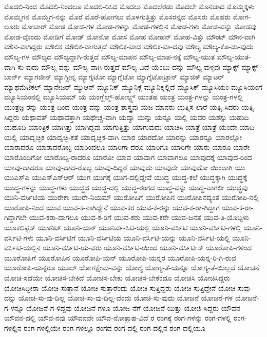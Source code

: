 {ಮೊದಲಿ-ನಿಂದ
ಮೊದಲಿ-ನಿಂದಲೂ
ಮೊದಲಿ-ರಿಸಿದ
ಮೊದಲು
ಮೊದಲೆರಡು
ಮೊದಲೇ
ಮೊನಚಾದ
ಮೊಮ್ಮಕ್ಕಳು
ಮೊಮ್ಮಗನ
ಮೊಮ್ಮಗ-ನನ್ನು
ಮೊರೆ
ಮೊರೆ-ಹೋಗಲು
ಮೊಳಗುತ್ತಿತ್ತು
ಮೊಸರನ್ನದ
ಮೊಸರು
ಮೊಹರು
ಮೋಗ-ಲೂರು
ಮೋಟಾರ್
ಮೋಡ
ಮೋಡ-ಗಳ
ಮೋಡ-ಗಳನ್ನು
ಮೋಡ-ಗಳಲ್ಲಿನ
ಮೋಡ-ಗಳು
ಮೋಡ-ವನ್ನು
ಮೋಡವು
ಮೋಡ-ವೊಂದು
ಮೋಡಿಗೆ
ಮೋಡ್
ಮೋನೋ
ಮೋಸ
ಮೋಹ
ಮೋಹನ್
ಮೋಹ-ವಿತ್ತು
ಮೌಂಟ್
ಮೌನ-ವಾಗಿ
ಮೌನ-ವಾಗಿದ್ದರು
ಮೌಲಿಕ
ಮೌಲಿಕ-ವಾಗುತ್ತದೆ
ಮೌಲಿಕ-ವಾದ
ಮೌಲಿಕ-ವಾ-ದವು
ಮೌಲ್ಯ
ಮೌಲ್ಯ-ಕೊ-ಡು-ವುದು
ಮೌಲ್ಯ-ಗಳ
ಮೌಲ್ಯದ
ಮೌಲ್ಯದ್ದಾಗಿ-ರುತ್ತದೆ
ಮೌಲ್ಯ-ಮಾಪನ
ಮೌಲ್ಯ-ಮಾಪ-ನಕ್ಕೆ
ಮೌಲ್ಯ-ಯುತ
ಮೌಲ್ಯ-ಯುತ-ವಾಗಿ-ಸು-ವುದು
ಮೌಲ್ಯ-ವನ್ನು
ಮೌಲ್ಯ-ವಾಗಿ-ರುತ್ತದೆ
ಮೌಲ್ಯ-ವಿದೆ-ಯೆಂಬು-ದನ್ನು
ಮೌಲ್ಯ-ವುಳ್ಳವು
ಮ್ಯಾಕ್ಸ್
ಮ್ಯಾಕ್ಸ್-ಬಾರ್ನ್
ಮ್ಯಾಗಜೀನ್
ಮ್ಯಾಗ್ಜೀನ್ನ
ಮ್ಯಾಗ್ನಟೋ
ಮ್ಯಾಗ್ನೆಟೋ
ಮ್ಯಾಗ್ನೆಟೋಟ್ರಾನ್
ಮ್ಯಾಜಿಕ್
ಮ್ಯಾಟರ್
ಮ್ಯಾಥಮೆಟಿಕಲ್
ಮ್ಯಾನೇಜರ್
ಮ್ಯುಆನ್
ಮ್ಯೂನಿಕ್
ಮ್ಯೂನಿಕ್ಗೆ
ಮ್ಯೂನಿಕ್ನಲ್ಲಿದೆ
ಮ್ಯೂಸಿಕ್
ಮ್ಯೂಸಿಯಂ
ಮ್ಯೂಸಿಯಂಗೆ
ಮ್ಯೂಸಿಯಂನಲ್ಲಿ
ಮ್ಯೂಸಿಯಮ್
ಯ
ಯಂಗ್ಹೆಲ್ಮ್-ಹೋಲ್ಟ್ಸ್
ಯಂತಹ
ಯಂತ್ರ
ಯಂತ್ರ-ಗಳನ್ನು
ಯಂತ್ರ-ಗಳಲ್ಲಿ
ಯಂತ್ರಜ್ಞ-ರನ್ನು
ಯಂತ್ರ-ದಿಂದ
ಯಂತ್ರ-ವನ್ನು
ಯಂತ್ರ-ಶಾಸ್ತ್ರವು
ಯಜ-ಮಾನರು
ಯತ್ನಿಸ-ಲಾರೆ
ಯತ್ನಿ-ಸಿದರು
ಯತ್ನಿ-ಸಿದ್ದರು
ಯಥಾವತ್
ಯಥಾವತ್ತಾಗಿ
ಯಥೇಚ್ಚ-ವಾಗಿ
ಯದ್ವಾ
ಯನ್ನು
ಯನ್ನೂ
ಯಲ್ಲಿ
ಯವರ
ಯಶಸ್ಸು
ಯಹುದಿ
ಯಹೂದಿ
ಯಾಂತ್ರಿಕ
ಯಾಗಿತ್ತು
ಯಾಗಿದ್ದವು
ಯಾಗುತ್ತಿತ್ತು
ಯಾಗುವುದು
ಯಾಚಿಸಿ
ಯಾತ್ರೆ
ಯಾತ್ರೆ-ಯೆಂದೇ
ಯಾದಿ-ಯಲ್ಲಿ
ಯಾದೃಚ್ಛಿಕ
ಯಾದೃಚ್ಛಿ-ಕತೆ
ಯಾದೃಚ್ಛಿಕ-ವಾಗಿ
ಯಾರ
ಯಾರದೋ
ಯಾರನ್ನು
ಯಾರನ್ನೂ
ಯಾರಲ್ಲೋ
ಯಾರಾದರೂ
ಯಾರಾದರೊಬ್ಬ
ಯಾರಿಂದಲೂ
ಯಾರಿಗಾ-ದರೂ
ಯಾರಿಗೂ
ಯಾರಿಗೇ
ಯಾರು
ಯಾರೂ
ಯಾರೇ
ಯಾರೊಂದಿಗೋ
ಯಾರೊಬ್ಬ-ರಾದರೂ
ಯಾರೋ
ಯಾವ
ಯಾವಾಗ
ಯಾವಾಗಲೂ
ಯಾವುದಕ್ಕೆ
ಯಾವುದ-ರಿಂದ
ಯಾವು-ದಾದರೂ
ಯಾವು-ದಾದ-ರೊಬ್ಬ
ಯಾವು-ದಿದ್ದರೆ
ಯಾವುದು
ಯಾವುದೇ
ಯಾವುದೋ
ಯಿಂದಾಗಿ
ಯು
ಯುಎಸ್ಎ
ಯುಎಸ್ಎಸ್ಆರ್
ಯುಗ
ಯುಗಕ್ಕೆ
ಯುಗ-ದಲ್ಲಿದ್ದೇವೆ
ಯುದ್ಧ
ಯುದ್ಧ-ಕಲೆ
ಯುದ್ಧಕ್ಕಾಗಿ
ಯುದ್ಧಕ್ಕೆ
ಯುದ್ಧ-ಗಳನ್ನು
ಯುದ್ಧ-ಗಳು
ಯುದ್ಧದ
ಯುದ್ಧ-ದಲ್ಲಿ
ಯುದ್ಧ-ರಂಗದ
ಯುದ್ಧ-ವನ್ನು
ಯುದ್ಧ-ವಾಗಲೀ
ಯುದ್ಧವು
ಯುನಿ-ವರ್ಸಿಟಿಯ
ಯುರೇಕಾ
ಯುರೇ-ನಿಯಮ್
ಯುರೋಪಿಗೆ
ಯುರೋಪಿನ
ಯುರೋಪಿನದ್ಯಂತ
ಯುರೋಪಿ-ನಲ್ಲಿ
ಯುರೋಪಿ-ನಿಂದ
ಯುವ
ಯುವ-ಕ-ನಾಗಿದ್ದೇನೆ
ಯುವ-ಕರ
ಯುವ-ಕ-ರನ್ನು
ಯುವ-ಕ-ರಾ-ಗಿದ್ದಾಗ
ಯುವ-ಕ-ರಾ-ಗಿದ್ದಾಗಲೇ
ಯುವ-ಕರಾ-ದಾಗಲೂ
ಯುವ-ಕ-ರಿಗೆ
ಯುವ-ಕರು
ಯುವ-ಕರೇ
ಯುವ-ಜನತೆ
ಯುವ-ತಿ-ಯೊಬ್ಬಳು
ಯೂಕಲಿಪ್ಟಸ್
ಯೂನಿಟ್
ಯೂನಿ-ಯನ್
ಯೂನಿರ್ವ-ಸಿಟಿ-ಯಲ್ಲಿ
ಯೂನಿ-ವರ್ಸಿಟಿ
ಯೂನಿ-ವರ್ಸಿಟಿ-ಗಳಲ್ಲಿ
ಯೂನಿ-ವರ್ಸಿಟಿ-ಗಳು
ಯೂನಿ-ವರ್ಸಿಟಿಗೆ
ಯೂನಿ-ವರ್ಸಿಟಿಯ
ಯೂನಿ-ವರ್ಸಿಟಿ-ಯನ್ನು
ಯೂನಿ-ವರ್ಸಿಟಿ-ಯಲ್ಲಿ
ಯೂನಿ-ವರ್ಸಿಟಿ-ಯಲ್ಲಿನ
ಯೂನಿ-ವರ್ಸಿಟಿ-ಯ-ವರು
ಯೂನಿ-ವರ್ಸಿಟಿ-ಯಿಂದ
ಯೂನಿ-ವರ್ಸಿಟೀಸ್
ಯೂರೋಪಿ-ಗಳಿಂದ
ಯೂರೋಪಿಗೆ
ಯೂರೋಪಿನ
ಯೂರೋಪಿ-ಯನ್
ಯೂರೋಪಿ-ಯನ್ನರ
ಯೂರೋಪಿ-ಯನ್ನ-ರಿ-ಗಿ-ರುವ
ಯೂರೋಪಿ-ಯನ್ನರೂ
ಯೂಲ್
ಯೋಗಕ್ಷೇಮ-ವನ್ನು
ಯೋಗ್ಯ
ಯೋಗ್ಯ-ತೆ-ಯನ್ನೂ
ಯೋಗ್ಯ-ತೆ-ಯಿಲ್ಲದೆ
ಯೋಚನೆ
ಯೋಚಿ-ಸದೆಯೇ
ಯೋಚಿಸ-ಬೇಕಿದೆ
ಯೋಚಿಸ-ಬೇಕು
ಯೋಚಿಸ-ಬೇಕೆಂದೂ
ಯೋಚಿಸಿ
ಯೋಚಿಸಿದ್ದರು
ಯೋಚಿಸಿದ್ದೀರಾ
ಯೋಚಿ-ಸುತ್ತಾನೆ
ಯೋಚಿ-ಸುತ್ತಾರೆಂದು
ಯೋಚಿ-ಸುತ್ತಿದ್ದರು
ಯೋಚಿ-ಸುತ್ತಿದ್ದೇನೆ
ಯೋಚಿ-ಸುವು-ದನ್ನು
ಯೋಚಿ-ಸು-ವು-ದಿಲ್ಲ
ಯೋಚಿ-ಸು-ವು-ದಿಲ್ಲ-ವೆಂದು
ಯೋಚಿ-ಸು-ವುದು
ಯೋಜನೆ
ಯೋಜನೆ-ಗಳ
ಯೋಜನೆ-ಗ-ಳನ್ನೂ
ಯೋಜನೆ-ಗ-ಳಿದ್ದವು
ಯೋಜನೆ-ಗಳೂ
ಯೋಜ-ನೆಗೆ
ಯೋಜನೆ-ಯಿತ್ತು
ಯೋಜಿ-ಸಿದ್ದರು
ಯೌವನ
ಯೌವನ-ದಲ್ಲಿ
ಯೌವ-ನವು
ಯೌವನವೇ
ಯೌವ-ನೋತ್ಸಾಹ-ವಿದೆ
ರ
ರಂಗಕ್ಕೆ
ರಂಗ-ಗಳನ್ನು
ರಂಗ-ಗಳಲ್ಲಿ
ರಂಗ-ಗಳಲ್ಲಿನ
ರಂಗ-ಗಳಲ್ಲಿಯೇ
ರಂಗ-ಗಳಲ್ಲೂ
ರಂಗದ
ರಂಗ-ದಲ್ಲಿ
ರಂಗ-ದಲ್ಲಿನ
ರಂಗ-ದಲ್ಲಿಯೂ
}
